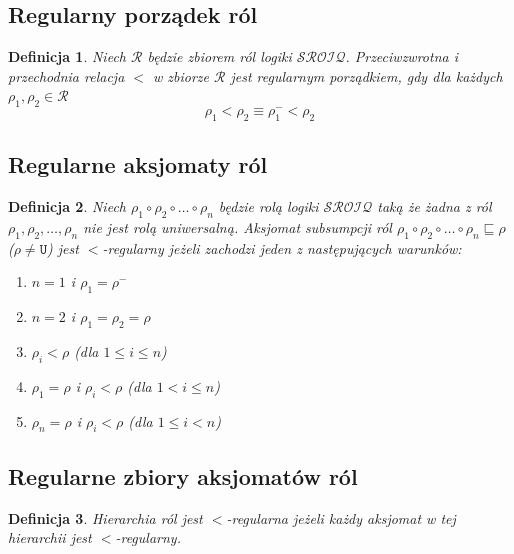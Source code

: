 \documentclass[12pt]{article}
\newtheorem{definicja}{Definicja}
\begin{document}
\subsection{Regularny porządek ról}
%
\begin{definicja}
Niech $\mathcal{R}$ będzie zbiorem ról logiki $\mathcal{SROIQ}$. Przeciwzwrotna i przechodnia relacja $<$ w zbiorze $\mathcal{R}$ jest \emph{regularnym porządkiem}, gdy dla każdych $\rho_1, \rho_2 \in \mathcal{R}$
$$\rho_{1} < \rho_{2} \equiv \rho_{1}^{-} < \rho_{2}$$
\end{definicja}
%

\subsection{Regularne aksjomaty ról}
%
\begin{definicja}
Niech $\rho_{1} \circ \rho_{2} \circ \dots \circ \rho_{n}$ będzie rolą logiki $\mathcal{SROIQ}$ taką że żadna z ról $\rho_{1}, \rho_{2}, \dots, \rho_{n}$ nie jest rolą uniwersalną.  
Aksjomat subsumpcji ról $\rho_{1} \circ \rho_{2} \circ \dots \circ \rho_{n} \sqsubseteq \rho$ ($\rho \neq \texttt{U}$) jest $<$-regularny jeżeli zachodzi jeden z następujących warunków:
\begin{enumerate}
\item $n=1$ i $\rho_{1} = \rho^{-}$
\item $n=2$ i $\rho_{1}=\rho_{2}=\rho$
\item $\rho_{i} < \rho$ (dla $1 \leq i \leq n$)
\item $\rho_{1}=\rho$ i $\rho_{i} < \rho$ (dla $1 < i \leq n$)
\item $\rho_{n}=\rho$ i $\rho_{i} < \rho$ (dla $1 \leq i < n$)
\end{enumerate}
\end{definicja}
%

\subsection{Regularne zbiory aksjomatów ról}
%
\begin{definicja}
Hierarchia ról jest $<$-regularna jeżeli każdy aksjomat w tej hierarchii jest $<$-regularny.
\end{definicja}
%
\end{document}
